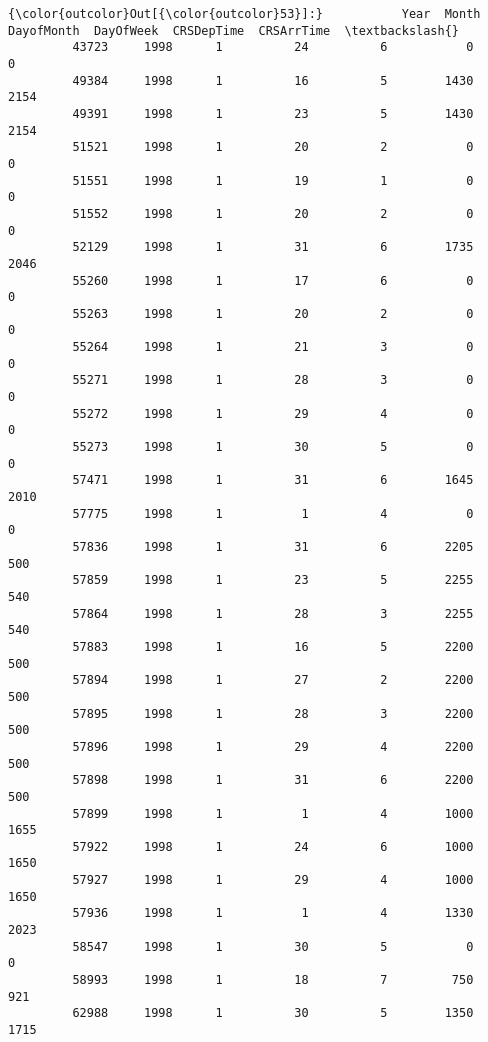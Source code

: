 \documentclass[11pt]{article}
\begin{document}
\begin{Verbatim}[commandchars=\\\{\}]
{\color{outcolor}Out[{\color{outcolor}53}]:}           Year  Month  DayofMonth  DayOfWeek  CRSDepTime  CRSArrTime  \textbackslash{}
         43723     1998      1          24          6           0           0   
         49384     1998      1          16          5        1430        2154   
         49391     1998      1          23          5        1430        2154   
         51521     1998      1          20          2           0           0   
         51551     1998      1          19          1           0           0   
         51552     1998      1          20          2           0           0   
         52129     1998      1          31          6        1735        2046   
         55260     1998      1          17          6           0           0   
         55263     1998      1          20          2           0           0   
         55264     1998      1          21          3           0           0   
         55271     1998      1          28          3           0           0   
         55272     1998      1          29          4           0           0   
         55273     1998      1          30          5           0           0   
         57471     1998      1          31          6        1645        2010   
         57775     1998      1           1          4           0           0   
         57836     1998      1          31          6        2205         500   
         57859     1998      1          23          5        2255         540   
         57864     1998      1          28          3        2255         540   
         57883     1998      1          16          5        2200         500   
         57894     1998      1          27          2        2200         500   
         57895     1998      1          28          3        2200         500   
         57896     1998      1          29          4        2200         500   
         57898     1998      1          31          6        2200         500   
         57899     1998      1           1          4        1000        1655   
         57922     1998      1          24          6        1000        1650   
         57927     1998      1          29          4        1000        1650   
         57936     1998      1           1          4        1330        2023   
         58547     1998      1          30          5           0           0   
         58993     1998      1          18          7         750         921   
         62988     1998      1          30          5        1350        1715   

\end{Verbatim}
\end{document}

